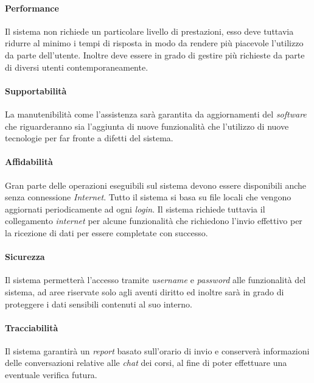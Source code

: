 \paragraph{Performance\\} 
Il sistema non richiede un particolare livello di prestazioni, esso deve tuttavia ridurre al minimo i tempi di risposta in modo da rendere più piacevole l’utilizzo da parte dell’utente. Inoltre deve essere in grado di gestire più richieste da parte di diversi utenti contemporaneamente.

\paragraph{Supportabilità\\} 
La manutenibilità come l’assistenza sarà garantita da aggiornamenti del \emph{software} che riguarderanno sia l’aggiunta di nuove funzionalità che l'utilizzo di nuove tecnologie per far fronte a difetti del sistema.

\paragraph{Affidabilità\\} 
Gran parte delle operazioni eseguibili sul sistema devono essere disponibili anche senza connessione \emph{Internet}. Tutto il sistema si basa su file locali che vengono aggiornati periodicamente ad ogni \emph{login}. Il sistema richiede tuttavia il collegamento \emph{internet} per alcune funzionalità che richiedono l’invio effettivo per la ricezione di dati per essere completate con successo.

\paragraph{Sicurezza\\} 
Il sistema permetterà l’accesso tramite \emph{username} e \emph{password} alle funzionalità del sistema, ad aree riservate solo agli aventi diritto ed inoltre sarà in grado di proteggere i dati sensibili contenuti al suo interno.

\paragraph{Tracciabilità\\} 
Il sistema garantirà un \emph{report} basato sull’orario di invio e conserverà informazioni delle conversazioni relative alle \emph{chat} dei corsi, al fine di poter effettuare una eventuale verifica futura. 

